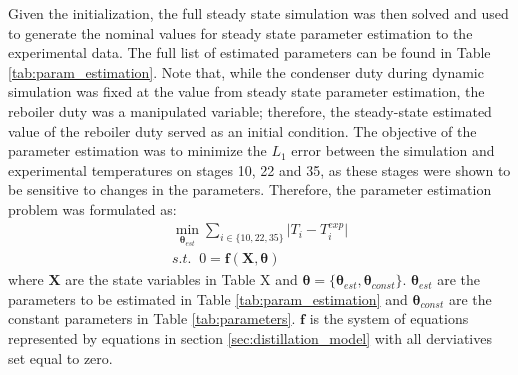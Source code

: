 Given the initialization, the full steady state simulation was then solved and used to generate the nominal values for steady state parameter estimation to the experimental data. The full list of estimated parameters can be found in Table \ref{tab:param_estimation}. Note that, while the condenser duty during dynamic simulation was fixed at the value from steady state parameter estimation, the reboiler duty was a manipulated variable; therefore, the steady-state estimated value of the reboiler duty served as an initial condition. The objective of the parameter estimation was to minimize the $L_1$ error between the simulation and experimental temperatures on stages 10, 22 and 35, as these stages were shown to be sensitive to changes in the parameters. Therefore, the parameter estimation problem was formulated as:
\begin{subequations}
    \begin{align}
        \min_{\boldsymbol \theta_{est}} \sum_{i\in \{10, 22, 35\}} \mathopen|T_i-T_i^{exp}\mathclose|\\
        s.t. \;\; 0 = \mathbf f(\mathbf X, \boldsymbol \theta)
    \end{align}
\end{subequations}
where $\mathbf X$ are the state variables in Table X  and $\boldsymbol \theta = \{\boldsymbol \theta_{est}, \boldsymbol \theta_{const} \}$.  $\boldsymbol \theta_{est}$ are the parameters to be estimated in Table \ref{tab:param_estimation} and $\boldsymbol \theta_{const}$ are the constant parameters in Table \ref{tab:parameters}. $\mathbf f$ is the system of equations represented by equations in section \ref{sec:distillation_model} with all derviatives set equal to zero. 
